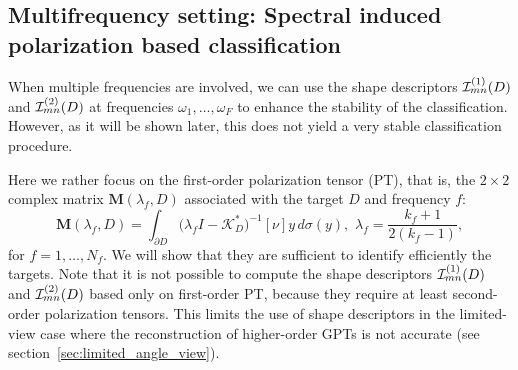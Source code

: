 


\subsection{Multifrequency setting: Spectral induced polarization based classification}

When multiple frequencies are involved, we can use the shape
descriptors $\mathcal{I}^{(1)}_{mn}(D)$ and $\mathcal{I}^{(2)}_{mn}(D)$ at frequencies
$\omega_1, \ldots, \omega_F$ to enhance the stability of the
classification. However, as it will be shown later, this does not
yield a very stable classification procedure.

Here we rather focus on the first-order polarization tensor (PT),
that is,  the  $2\times2$ complex matrix $\mathbf{M}(\lambda_f,D)$
associated with the target $D$ and frequency $f$:
$$
\mathbf{M}(\lambda_f,D)= \int_{\partial D} \bigg(\lambda_f
I-\mathcal{K}_{D}^{*} \bigg)^{-1}[\nu] y \, d\sigma(y),
\, \, \lambda_f = \frac{k_f+1}{2(k_f-1)},
$$
for $f=1,\ldots, N_f$. We will show that they are sufficient to
identify  efficiently the targets. Note that it is not possible to
compute the shape descriptors $\mathcal{I}^{(1)}_{mn}(D)$ and
$\mathcal{I}^{(2)}_{mn}(D)$ based only on first-order PT, because they
require at least second-order polarization tensors. This limits
the use of shape descriptors in the limited-view case where the
reconstruction of higher-order GPTs is not accurate (see section~\ref{sec:limited_angle_view}).

